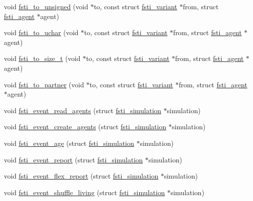\begin{DoxyCompactItemize}
\item 
void \mbox{\hyperlink{fsti-events_8h_a0dea3a294caae9f80119ec53f4116f0f}{fsti\+\_\+to\+\_\+unsigned}} (void $\ast$to, const struct \mbox{\hyperlink{structfsti__variant}{fsti\+\_\+variant}} $\ast$from, struct \mbox{\hyperlink{structfsti__agent}{fsti\+\_\+agent}} $\ast$agent)
\item 
void \mbox{\hyperlink{fsti-events_8h_aad3a0605b88803863e016f9409df45ba}{fsti\+\_\+to\+\_\+uchar}} (void $\ast$to, const struct \mbox{\hyperlink{structfsti__variant}{fsti\+\_\+variant}} $\ast$from, struct \mbox{\hyperlink{structfsti__agent}{fsti\+\_\+agent}} $\ast$agent)
\item 
void \mbox{\hyperlink{fsti-events_8h_ace7211e8e83bb5273066bc5fe50585a6}{fsti\+\_\+to\+\_\+size\+\_\+t}} (void $\ast$to, const struct \mbox{\hyperlink{structfsti__variant}{fsti\+\_\+variant}} $\ast$from, struct \mbox{\hyperlink{structfsti__agent}{fsti\+\_\+agent}} $\ast$agent)
\item 
void \mbox{\hyperlink{fsti-events_8h_aad5bd92a57743b08d6c9eb5bac33c78b}{fsti\+\_\+to\+\_\+partner}} (void $\ast$to, const struct \mbox{\hyperlink{structfsti__variant}{fsti\+\_\+variant}} $\ast$from, struct \mbox{\hyperlink{structfsti__agent}{fsti\+\_\+agent}} $\ast$agent)
\item 
void \mbox{\hyperlink{fsti-events_8h_ad8de30dd9c073568ba37e05c7500cb60}{fsti\+\_\+event\+\_\+read\+\_\+agents}} (struct \mbox{\hyperlink{structfsti__simulation}{fsti\+\_\+simulation}} $\ast$simulation)
\item 
void \mbox{\hyperlink{fsti-events_8h_a030bb87f8eda0fe6b1ef2ed7be908e60}{fsti\+\_\+event\+\_\+create\+\_\+agents}} (struct \mbox{\hyperlink{structfsti__simulation}{fsti\+\_\+simulation}} $\ast$simulation)
\item 
void \mbox{\hyperlink{fsti-events_8h_a37075282270dcb4f507a3cf7a302dc21}{fsti\+\_\+event\+\_\+age}} (struct \mbox{\hyperlink{structfsti__simulation}{fsti\+\_\+simulation}} $\ast$simulation)
\item 
void \mbox{\hyperlink{fsti-events_8h_a7e3b0a5901eb7df429eb2cf112dae628}{fsti\+\_\+event\+\_\+report}} (struct \mbox{\hyperlink{structfsti__simulation}{fsti\+\_\+simulation}} $\ast$simulation)
\item 
void \mbox{\hyperlink{fsti-events_8h_a206a2f2361426e4c10c19a3f3cce41d7}{fsti\+\_\+event\+\_\+flex\+\_\+report}} (struct \mbox{\hyperlink{structfsti__simulation}{fsti\+\_\+simulation}} $\ast$simulation)
\item 
void \mbox{\hyperlink{fsti-events_8h_a2189b9c6c5bd7d490a1171b1bee5d4bf}{fsti\+\_\+event\+\_\+shuffle\+\_\+living}} (struct \mbox{\hyperlink{structfsti__simulation}{fsti\+\_\+simulation}} $\ast$simulation)

\end{DoxyCompactItemize}
